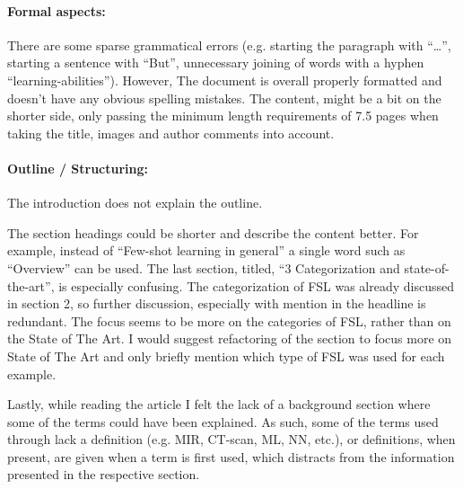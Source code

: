 \documentclass[12pt]{scrartcl}
\begin{document}



\paragraph{Formal aspects:} There are some sparse grammatical errors (e.g.
starting the paragraph with ``\dots'', starting a sentence with ``But'',
unnecessary joining of words with a hyphen ``learning-abilities''). However,
The document is overall properly formatted and doesn't have any obvious
spelling mistakes. The content, might be a bit on the shorter side, only
passing the minimum length requirements of 7.5 pages when taking the title,
images and author comments into account.






\paragraph{Outline / Structuring:} 

The introduction does not explain the outline.

The section headings could be shorter and describe the content better.
For example, instead of ``Few-shot learning in general'' a single word such as
``Overview'' can be used. The last section, titled, ``3 Categorization and state-of-the-art'', is especially confusing. The categorization of FSL was already discussed in section 2, so further discussion, especially with mention in the headline is redundant. The focus seems to be more on the categories of FSL, rather than on the State of The Art. I would suggest refactoring of the section to focus more on State of The Art and only briefly mention which type of FSL was used for each example.

Lastly, while reading the article I felt the lack of a background section where
some of the terms could have been explained. As such, some of the terms used
through lack a definition (e.g. MIR, CT-scan, ML, NN, etc.), or definitions,
when present, are given when a term is first used, which distracts from the
information presented in the respective section.
\end{document}
